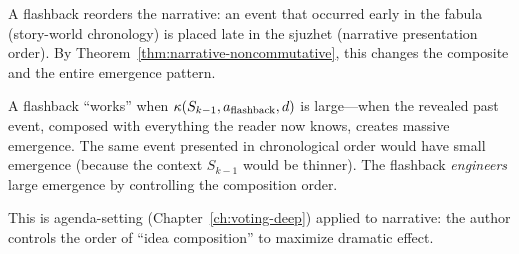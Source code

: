 \begin{interpretation}
\label{interp:flashbacks}
A flashback reorders the narrative: an event that occurred early in the
fabula (story-world chronology) is placed late in the sjuzhet (narrative
presentation order).  By Theorem~\ref{thm:narrative-noncommutative}, this
changes the composite and the entire emergence pattern.

A flashback ``works'' when $\kappa(S_{k-1}, a_{\text{flashback}}, d)$ is
large---when the revealed past event, composed with everything the reader
now knows, creates massive emergence.  The same event presented in
chronological order would have small emergence (because the context $S_{k-1}$
would be thinner).  The flashback \emph{engineers} large emergence by
controlling the composition order.

This is agenda-setting (Chapter~\ref{ch:voting-deep}) applied to narrative:
the author controls the order of ``idea composition'' to maximize dramatic
effect.
\end{interpretation}

